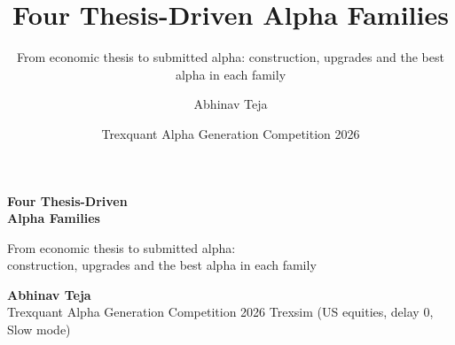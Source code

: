 \documentclass[aspectratio=169,10pt]{beamer}
\title{Four Thesis-Driven Alpha Families}
\subtitle{From economic thesis to submitted alpha: construction, upgrades and the best alpha in each family}
\author{Abhinav Teja}
\date{Trexquant Alpha Generation Competition 2026}
\begin{document}
\begin{frame}[plain]
\vspace{30pt}
{\Huge\bfseries Four Thesis-Driven\\[2pt] Alpha Families\par}
\vspace{10pt}
{\large\color{muted} From economic thesis to submitted alpha:\\construction, upgrades and the best alpha in each family\par}
\vspace{22pt}
\vfill
{\small\bfseries Abhinav Teja}\\
{\small\color{muted} Trexquant Alpha Generation Competition 2026 \textperiodcentered{} Trexsim (US equities, delay 0, Slow mode)}
\end{frame}
\end{document}
